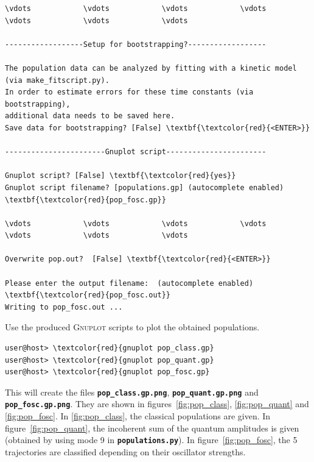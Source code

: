 \documentclass[a4paper,11pt,DIV=15,openany]{scrbook}
\newcommand{\ttt}[1]{\textbf{\texttt{#1}}}
\begin{document}
\begin{oframed}
\begin{Verbatim}[commandchars=\\\{\}]
\vdots            \vdots            \vdots            \vdots            \vdots            \vdots            \vdots            

------------------Setup for bootstrapping?------------------

The population data can be analyzed by fitting with a kinetic model (via make_fitscript.py). 
In order to estimate errors for these time constants (via bootstrapping), 
additional data needs to be saved here.
Save data for bootstrapping? [False] \textbf{\textcolor{red}{<ENTER>}}

-----------------------Gnuplot script-----------------------

Gnuplot script? [False] \textbf{\textcolor{red}{yes}}
Gnuplot script filename? [populations.gp] (autocomplete enabled) \textbf{\textcolor{red}{pop_fosc.gp}}

\vdots            \vdots            \vdots            \vdots            \vdots            \vdots            \vdots            

Overwrite pop.out?  [False] \textbf{\textcolor{red}{<ENTER>}}

Please enter the output filename:  (autocomplete enabled) \textbf{\textcolor{red}{pop_fosc.out}}
Writing to pop_fosc.out ...
\end{Verbatim}
\end{oframed}

\normalsize
Use the produced \textsc{Gnuplot} scripts to plot the obtained populations.
\begin{Verbatim}[commandchars=\\\{\}]
user@host> \textcolor{red}{gnuplot pop_class.gp}
user@host> \textcolor{red}{gnuplot pop_quant.gp}
user@host> \textcolor{red}{gnuplot pop_fosc.gp}
\end{Verbatim}

This will create the files \ttt{pop\_class.gp.png}, \ttt{pop\_quant.gp.png} and \ttt{pop\_fosc.gp.png}. They are shown in figures~\ref{fig:pop_class}, \ref{fig:pop_quant} and \ref{fig:pop_fosc}. 
In \ref{fig:pop_class}, the classical populations are given. 
In figure~\ref{fig:pop_quant}, the incoherent sum of the quantum amplitudes is given (obtained by using mode 9 in \ttt{populations.py}).
In figure~\ref{fig:pop_fosc}, the 5 trajectories are classified depending on their oscillator strengths.
\end{document}
